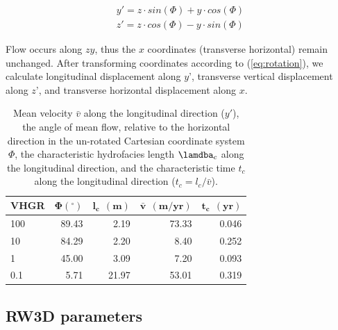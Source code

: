\begin{equation}
\begin{aligned}
\label{eq:rotation}
    y' = z \cdot sin(\Phi) + y \cdot cos(\Phi) \\
    z' = z \cdot cos(\Phi) - y \cdot sin(\Phi)
\end{aligned}
\end{equation}

Flow occurs along $zy$, thus the $x$ coordinates (transverse horizontal) remain unchanged. After transforming coordinates according to (\ref{eq:rotation}), we calculate longitudinal displacement along $y’$, transverse vertical displacement along $z’$, and transverse horizontal displacement along $x$.



\bgroup

\renewcommand{\arraystretch}{1.5}

\setlength{\tabcolsep}{20pt}

\begin{table}[H]

\caption{Mean velocity $\bar{v}$ along the longitudinal direction ($y'$), the angle of mean flow, relative to the horizontal direction in the un-rotated Cartesian coordinate system $\Phi$, the characteristic hydrofacies length $\lamdba_c$ along the longitudinal direction, and the characteristic time $t_c$ along the longitudinal direction ($t_c = l_c / \bar{v}$).} 
\centering


\begin{tabular}{lrrrr}
\label{ap_c_tc}

\textbf{VHGR} & $\bm{\Phi} (^{\circ})$ & $\bm{l_c \: \: (m)}$ & $\bm{\bar{v} \: \: (m/yr)}$ & $\bm{t_c \: \: (yr)}$  \\ 
\hline
   100 & 89.43 & 2.19  & 73.33 & 0.046 \\
   10  & 84.29 & 2.20  & 8.40  & 0.252 \\
   1   & 45.00 & 3.09  & 7.20  & 0.093 \\
   0.1 & 5.71  & 21.97 & 53.01 & 0.319 \\
\hline
\end{tabular}

\end{table}
\egroup




\subsection{RW3D parameters}


